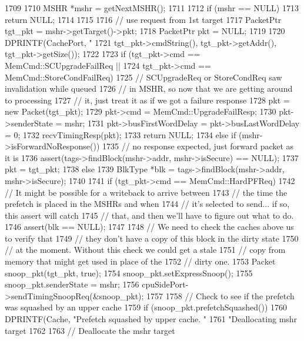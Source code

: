 \begin{DoxyCode}
1709 {
1710     MSHR *mshr = getNextMSHR();
1711 
1712     if (mshr == NULL) {
1713         return NULL;
1714     }
1715 
1716     // use request from 1st target
1717     PacketPtr tgt_pkt = mshr->getTarget()->pkt;
1718     PacketPtr pkt = NULL;
1719 
1720     DPRINTF(CachePort, "%
1721             tgt_pkt->cmdString(), tgt_pkt->getAddr(), tgt_pkt->getSize());
1722 
1723     if (tgt_pkt->cmd == MemCmd::SCUpgradeFailReq ||
1724         tgt_pkt->cmd == MemCmd::StoreCondFailReq) {
1725         // SCUpgradeReq or StoreCondReq saw invalidation while queued
1726         // in MSHR, so now that we are getting around to processing
1727         // it, just treat it as if we got a failure response
1728         pkt = new Packet(tgt_pkt);
1729         pkt->cmd = MemCmd::UpgradeFailResp;
1730         pkt->senderState = mshr;
1731         pkt->busFirstWordDelay = pkt->busLastWordDelay = 0;
1732         recvTimingResp(pkt);
1733         return NULL;
1734     } else if (mshr->isForwardNoResponse()) {
1735         // no response expected, just forward packet as it is
1736         assert(tags->findBlock(mshr->addr, mshr->isSecure) == NULL);
1737         pkt = tgt_pkt;
1738     } else {
1739         BlkType *blk = tags->findBlock(mshr->addr, mshr->isSecure);
1740 
1741         if (tgt_pkt->cmd == MemCmd::HardPFReq) {
1742             // It might be possible for a writeback to arrive between
1743             // the time the prefetch is placed in the MSHRs and when
1744             // it's selected to send... if so, this assert will catch
1745             // that, and then we'll have to figure out what to do.
1746             assert(blk == NULL);
1747 
1748             // We need to check the caches above us to verify that
1749             // they don't have a copy of this block in the dirty state
1750             // at the moment. Without this check we could get a stale
1751             // copy from memory that might get used in place of the
1752             // dirty one.
1753             Packet snoop_pkt(tgt_pkt, true);
1754             snoop_pkt.setExpressSnoop();
1755             snoop_pkt.senderState = mshr;
1756             cpuSidePort->sendTimingSnoopReq(&snoop_pkt);
1757 
1758             // Check to see if the prefetch was squashed by an upper cache
1759             if (snoop_pkt.prefetchSquashed()) {
1760                 DPRINTF(Cache, "Prefetch squashed by upper cache.  "
1761                                "Deallocating mshr target %
1762 
1763                 // Deallocate the mshr target
}}}}
\end{DoxyCode}
